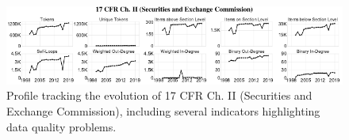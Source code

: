 \documentclass[utf8,sort&compress,numbers,square,table,hidelinks]{frontiers_suppmat} %
\begin{document}
\begin{figure}
	\centering
	\vspace*{0pt}\includegraphics[width=\textwidth]{figure_si_profiles.pdf}
	\caption{%
		Profile tracking the evolution of 17 CFR Ch. II (Securities and Exchange Commission),
		including several indicators highlighting data quality problems.
	}
	\label{fig:si-profile-17-cfr-ii}
\end{figure}

\newpage






\end{document}
